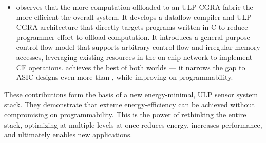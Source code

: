 \begin{itemize}
\item \riptide observes that the more computation offloaded to an ULP CGRA fabric the more efficient the overall system.
% 
It develops a dataflow compiler and ULP CGRA architecture that directly targets programs written in C to reduce programmer effort to offload computation.
% 
It introduces a general-purpose control-flow model that supports arbitrary control-flow and irregular memory accesses, leveraging existing resources in the on-chip network to implement CF operations.
% 
\riptide achieves the best of both worlds --- it narrows the gap to ASIC designs even more than \snafu, while improving on programmability.
\end{itemize}

These contributions form the basis of a new energy-minimal, ULP sensor system stack.
% 
They demonstrate that exteme energy-efficiency can be achieved without compromising on programmability.
%
This is the power of rethinking the entire stack, optimizing at multiple levels at once reduces energy, increases performance, and ultimately enables new applications.